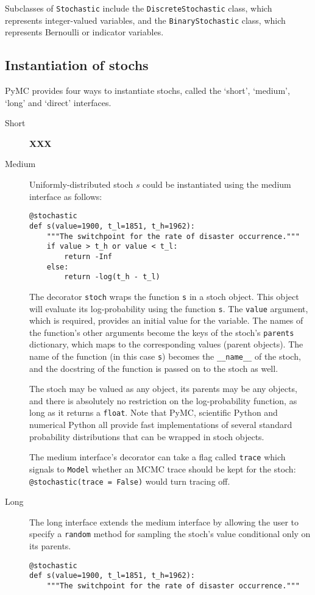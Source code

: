 Subclasses of \texttt{Stochastic} include the \texttt{DiscreteStochastic} class, which represents integer-valued variables, and the \texttt{BinaryStochastic} class, which represents Bernoulli or indicator variables. 

\subsection{Instantiation of stochs}
PyMC provides four ways to instantiate stochs, called the `short', `medium', `long' and `direct' interfaces.
\begin{description}
    \item[Short] \textbf{XXX}
    \item[Medium] Uniformly-distributed stoch $s$ could be instantiated using the medium interface as follows:
    \begin{verbatim}
@stochastic
def s(value=1900, t_l=1851, t_h=1962):
    """The switchpoint for the rate of disaster occurrence."""
    if value > t_h or value < t_l:
        return -Inf
    else:
        return -log(t_h - t_l) 
    \end{verbatim}
    The decorator \texttt{stoch} wraps the function \texttt{s} in a stoch object. This object will evaluate its log-probability using the function \texttt{s}. The \texttt{value} argument, which is required, provides an initial value for the variable. The names of the function's other arguments become the keys of the stoch's \texttt{parents} dictionary, which maps to the corresponding values (parent objects). The name of the function (in this case \texttt{s}) becomes the \texttt{\_\_name\_\_} of the stoch, and the docstring of the function is passed on to the stoch as well.

The stoch may be valued as any object, its parents may be any objects, and there is absolutely no restriction on the log-probability function, as long as it returns a \texttt{float}. Note that PyMC, scientific Python and numerical Python all provide fast implementations of several standard probability distributions that can be wrapped in stoch objects.

    The medium interface's decorator can take a flag called \texttt{trace} which signals to \texttt{Model} whether an MCMC trace should be kept for the stoch: \texttt{@stochastic(trace = False)} would turn tracing off.

    \item[Long] The long interface extends the medium interface by allowing the user to specify a \texttt{random} method for sampling the stoch's value conditional only on its parents.
    \begin{verbatim}
@stochastic
def s(value=1900, t_l=1851, t_h=1962):
    """The switchpoint for the rate of disaster occurrence."""


\end{verbatim}
\end{description}
